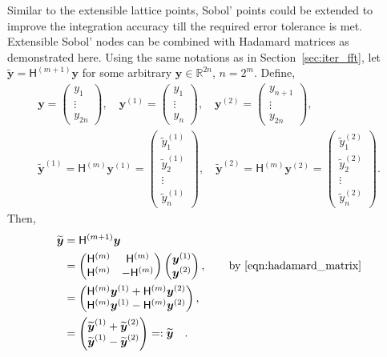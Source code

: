 \documentclass{iitthesis}          %
\newcommand{\bm}[1]{\boldsymbol{#1}}
\newcommand{\reals}{\mathbb{R}}
\newcommand{\vy}{\bm{y}}
\newcommand{\mH}{\mathsf{H}}
\newcommand\secref{Section~\ref}
\begin{document}
Similar to the extensible lattice points, Sobol' points could be extended to improve the integration accuracy till the required error tolerance is met. Extensible Sobol' nodes can be combined with Hadamard matrices as demonstrated here. Using the same notations as in \secref{sec:iter_fft}, let $\widetilde{\vy} = \mH^{(m+1)} {\vy}$ for some arbitrary $\vy \in \reals^{2n}$, $n = 2^m$. Define, 
\begin{gather*}
\vy = \begin{pmatrix} y_1 \\ \vdots \\ y_{2n} \end{pmatrix}, \quad 
\vy^{(1)} = \begin{pmatrix} y_1 \\ \vdots \\ y_{n} \end{pmatrix}, \quad 
\vy^{(2)}  = \begin{pmatrix} y_{n+1} \\ \vdots \\ y_{2n} \end{pmatrix}, \\ 
\widetilde{\vy}^{(1)} = \mH^{(m)} \vy^{(1)} = 
\begin{pmatrix} \widetilde{y}^{(1)}_1 \\ \widetilde{y}^{(1)}_2 \\ \vdots \\ \widetilde{y}^{(1)}_{n} \end{pmatrix}, \quad 
\widetilde{\vy}^{(2)}  =  \mH^{(m)} \vy^{(2)} =
\begin{pmatrix} \widetilde{y}^{(2)}_{1} \\  \widetilde{y}^{(2)}_{2} \\ \vdots \\ \widetilde{y}^{(2)}_{n} \end{pmatrix}. 
\end{gather*}
Then,
\begin{align*}
\widetilde{\vy} &= \mH^{({m+1})} {\vy} \\
& = \begin{pmatrix}
\mH^{(m)} & \mH^{(m)} \\ \mH^{(m)} & - \mH^{(m)}
\end{pmatrix} 
\begin{pmatrix}
\vy^{(1)} \\ \vy^{(2)}
\end{pmatrix}, \qquad \text{by \eqref{eqn:hadamard_matrix}} \\
&= 
\begin{pmatrix}
\mH^{(m)} \vy^{(1)} + \mH^{(m)} \vy^{(2)} \\ 
\mH^{(m)} \vy^{(1)} - \mH^{(m)} \vy^{(2)}
\end{pmatrix},\\
&= 
\begin{pmatrix}
\widetilde{\vy}^{(1)} + \widetilde {\vy}^{(2)} \\ 
\widetilde {\vy}^{(1)} - \widetilde {\vy}^{(2)}
\end{pmatrix} =: \widetilde{\vy} \quad.
\end{align*}
\end{document}

